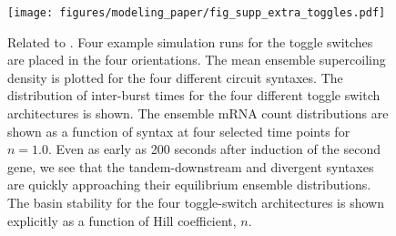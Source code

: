\documentclass[11pt]{article} %
\begin{document}
\begin{figure}[htbp]
    \centering
    {\texttt{[image: figures/modeling\_paper/fig\_supp\_extra\_toggles.pdf]}
    \label{fig:supp_toggles_run_examples}
    \label{fig:supp_toggles_mean_sc_density}
    \label{fig:supp_toggles_interburst_time}
    \label{fig:supp:n1_toggle_distributions}
    \label{fig:supp:toggles_hill_n_sweep}
    }
    \caption{Related to .
         Four example simulation runs for the toggle switches are placed in the four orientations. 
         The mean ensemble supercoiling density is plotted for the four different circuit syntaxes.
         The distribution of inter-burst times for the four different toggle switch architectures is shown.
         The ensemble mRNA count distributions are shown as a function of syntax at four selected time points for \(n = 1.0\). Even as early as 200 seconds after induction of the second gene, we see that the tandem-downstream and divergent syntaxes are quickly approaching their equilibrium ensemble distributions.
         The basin stability for the four toggle-switch architectures is shown explicitly as a function of Hill coefficient, \(n\).
    }
    \label{fig:top:supp_toggles}
\end{figure}
\end{document}

